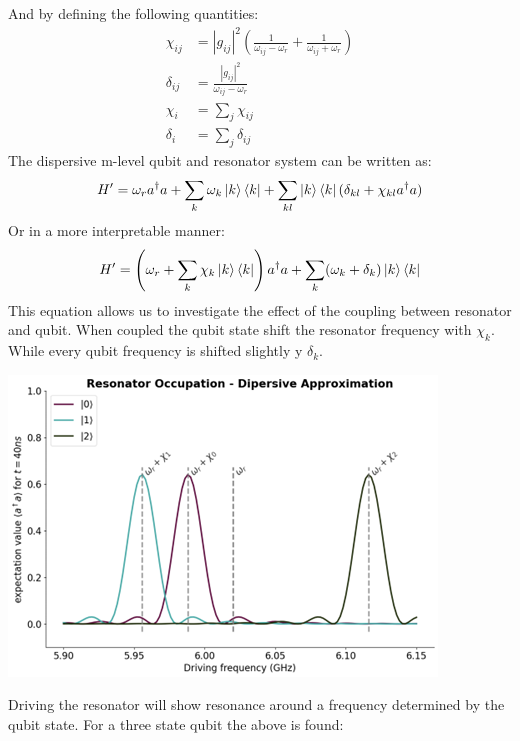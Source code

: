 And by defining the following quantities:
\begin{align}
    \chi_{ij} &= |g_{ij}|^2 \left(\frac{1}{\omega_{ij} - \omega_r} + \frac{1}{\omega_{ij} + \omega_r} \right) \\
    \delta_{ij} &= \frac{|g_{ij}|^2 }{\omega_{ij} - \omega_r} \\
    \chi_{i} &= \sum_j \chi_{ij} \\
    \delta_{i} &= \sum_j \delta_{ij} 
\end{align}
The dispersive m-level qubit and resonator system can be written as:
\begin{equation}
    H' = \omega_r a^\dagger a + \sum_k \omega_k \ket{k}\bra{k} + \sum_{kl}\ket{k}\bra{k}(\delta_{kl} + \chi_{kl} a^\dagger a )
\end{equation}
Or in a more interpretable manner:
\begin{equation} \label{eq:multi_qubit_dispersive_hamiltonian}
    H' = \left(\omega_r + \sum_k \chi_k \ket{k}\bra{k} \right) a^\dagger a + \sum_k (\omega_k + \delta_k)\ket{k}\bra{k}
\end{equation}
This equation allows us to investigate the effect of the coupling between resonator and qubit. When coupled the qubit state shift the resonator frequency with $\chi_k$. While every qubit frequency is shifted slightly y $\delta_k$.

\begin{marginfigure}
    \centering
    \includegraphics{Figs/Sections/computations_and_readout/three_qubit_states_dispersive.png}
    \caption{Driving the resonator will show resonance around a frequency determined by the qubit state. For a three state qubit the above is found:}
    \label{fig:three_state_dispersive}
\end{marginfigure}

